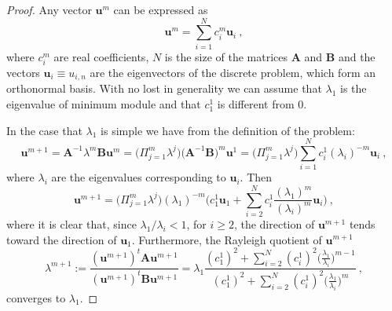 \documentclass[preprint,12pt]{elsarticle}
\begin{document}
\begin{proof}
Any vector $\mathbf{u}^m$ can be expressed as 
$$
\mathbf{u}^m=\sum_{i=1}^N c_i^m \mathbf{u}_i\ ,
$$
where $c_i^m$ are real coefficients, $N$ is the size of the matrices $\mathbf{A}$ and $\mathbf{B}$ and the vectors $\mathbf{u}_i\equiv u_{i,n}$ are the eigenvectors of the discrete problem, which form an orthonormal basis.
With no lost in generality we can assume that $\lambda_1$ is the eigenvalue of minimum module and that $c_1^1$ is different from 0.

In the case that $\lambda_1$ is simple we have from the definition of the problem:
$$
\mathbf{u}^{m+1}=\mathbf{A}^{-1}\lambda^m\mathbf{B}\mathbf{u}^{m}
=\Big(\Pi_{j=1}^m\lambda^{j}\Big)\Big(\mathbf{A}^{-1}\mathbf{B}\Big)^m\mathbf{u}^1
=\Big(\Pi_{j=1}^m\lambda^{j}\Big)\sum_{i=1}^N c_i^1 (\lambda_i)^{-m}\mathbf{u}_i\ ,
$$
where $\lambda_i$ are the eigenvalues corresponding to $\mathbf{u}_i$.
Then
$$
\mathbf{u}^{m+1}=\Big(\Pi_{j=1}^m\lambda^{j}\Big)(\lambda_1)^{-m}\Big( c_1^1 \mathbf{u}_1 +
\sum_{i=2}^N c_i^1\frac{(\lambda_1)^m}{(\lambda_i)^{m}}\mathbf{u}_i\Big) \ ,
$$
where it is clear that, since $\lambda_1/\lambda_i<1$, for $i\ge 2$, the direction of $\mathbf{u}^{m+1}$ tends toward the direction of $\mathbf{u}_1$. Furthermore, the Rayleigh quotient of $\mathbf{u}^{m+1}$
$$
\lambda^{m+1}:=\frac{(\mathbf{u}^{m+1})^t\mathbf{A}\mathbf{u}^{m+1}}{(\mathbf{u}^{m+1})^t\mathbf{B}\mathbf{u}^{m+1}}
=\lambda_1 \frac{\displaystyle(c_1^1)^2 +
\sum_{i=2}^N (c_i^1)^2\Bigg(\frac{\lambda_1}{\lambda_i}\Bigg)^{m-1}}
{\displaystyle(c_1^1)^2 +
\sum_{i=2}^N (c_i^1)^2\Bigg(\frac{\lambda_1}{\lambda_i}\Bigg)^{m}}\ ,
$$
converges to $\lambda_1$.



\end{proof}
\end{document}
